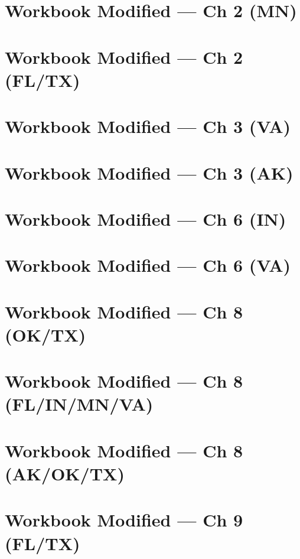 \documentclass[12pt, fleqn, openany, oneside]{studyGuide}
\begin{document}
\chapter{Workbook Modified — Ch 2 (MN)}


\chapter{Workbook Modified — Ch 2 (FL/TX)}


\chapter{Workbook Modified — Ch 3 (VA)}


\chapter{Workbook Modified — Ch 3 (AK)}


\chapter{Workbook Modified — Ch 6 (IN)}


\chapter{Workbook Modified — Ch 6 (VA)}


\chapter{Workbook Modified — Ch 8 (OK/TX)}


\chapter{Workbook Modified — Ch 8 (FL/IN/MN/VA)}


\chapter{Workbook Modified — Ch 8 (AK/OK/TX)}


\chapter{Workbook Modified — Ch 9 (FL/TX)}


\printAnswerKey
\end{document}
